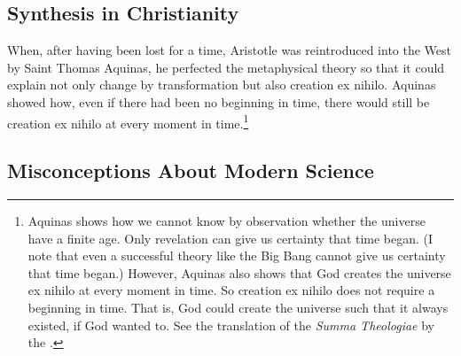 \documentclass[twocolumn]{article}
\begin{document}
\subsection{Synthesis in Christianity}

When, after having been lost for a time, Aristotle was reintroduced into the
West by Saint Thomas Aquinas, he perfected the metaphysical theory so that it
could explain not only change by transformation but also creation ex nihilo.
Aquinas showed how, even if there had been no beginning in time, there would
still be creation ex nihilo at every moment in time.\footnote{%
   Aquinas shows how we cannot know by observation whether the universe have a
   finite age.  Only revelation can give us certainty that time began.  (I note
   that even a successful theory like the Big Bang cannot give us certainty
   that time began.)  However, Aquinas also shows that God creates the universe
   ex nihilo at every moment in time.  So creation ex nihilo does not require a
   beginning in time.  That is, God could create the universe such that it
   always existed, if God wanted to.  See the translation of the {\it Summa
   Theologiae} by the \citet[I, Q45, A1, and I, Q46, A1]{e1920}.
}

\subsection{Misconceptions About Modern Science}
\end{document}
